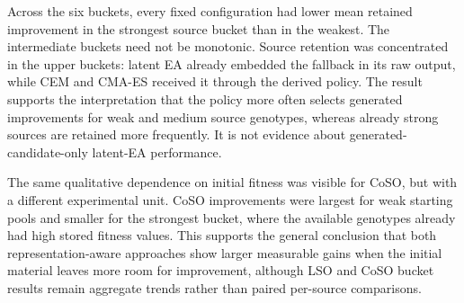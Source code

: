 Across the six buckets, every fixed configuration had lower mean retained improvement in the strongest source bucket than in the weakest. The intermediate buckets need not be monotonic. Source retention was concentrated in the upper buckets: latent EA already embedded the fallback in its raw output, while CEM and CMA-ES received it through the derived policy. The result supports the interpretation that the policy more often selects generated improvements for weak and medium source genotypes, whereas already strong sources are retained more frequently. It is not evidence about generated-candidate-only latent-EA performance.

The same qualitative dependence on initial fitness was visible for CoSO, but with a different experimental unit. CoSO improvements were largest for weak starting pools and smaller for the strongest bucket, where the available genotypes already had high stored fitness values. This supports the general conclusion that both representation-aware approaches show larger measurable gains when the initial material leaves more room for improvement, although LSO and CoSO bucket results remain aggregate trends rather than paired per-source comparisons.

